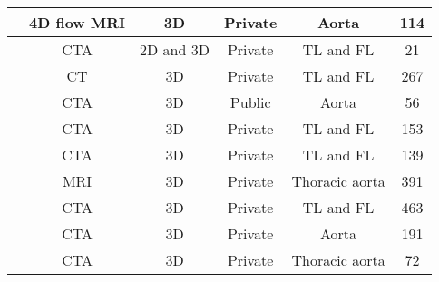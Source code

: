 \begin{table*}[!hbt]
\begin{tabular}{|c|c|c|c|c|c|}
\cite{manokaran2023fully}    & 4D flow MRI    & 3D          & Private        & Aorta                          & 114 \\ \hline
\cite{feiger2021evaluation}  & CTA            & 2D and 3D   & Private        & TL and FL                      & 21  \\ \hline
\cite{lin2023deformable}     & CT             & 3D          & Private        & TL and FL                      & 267 \\ \hline
\cite{sun2024paratranscnn}   & CTA            & 3D          & Public         & Aorta                          & 56  \\ \hline
\cite{hahn2020ct}            & CTA            & 3D          & Private        & TL and FL                      & 153 \\ \hline
\cite{yu2021three}           & CTA            & 3D          & Private        & TL and FL                      & 139 \\ \hline
\cite{guo2024deep}           & MRI            & 3D          & Private        & Thoracic aorta                 & 391 \\ \hline
\cite{feng2023automatic}     & CTA            & 3D          & Private        & TL and FL                      & 463 \\ \hline
\cite{sieren2022automated}   & CTA            & 3D          & Private        & Aorta                          & 191 \\ \hline
\cite{comelli2021deep}       & CTA            & 3D          & Private        & Thoracic aorta                 & 72  \\ \hline
\end{tabular}
\label{tab:literature_review}
\end{table*}

